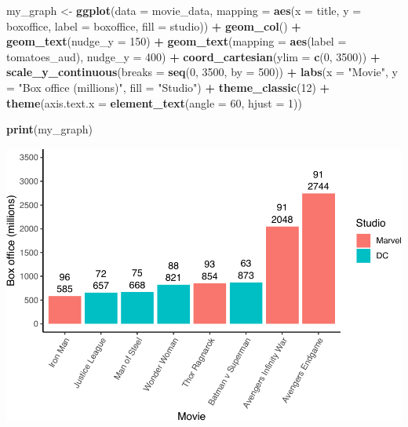 \documentclass[
]{krantz}
\makeatletter
\newenvironment{Shaded}{\begin{snugshade}}{\end{snugshade}}
\newcommand{\DataTypeTok}[1]{\textcolor[rgb]{0.27,0.27,0.27}{#1}}
\newcommand{\DecValTok}[1]{\textcolor[rgb]{0.06,0.06,0.06}{#1}}
\newcommand{\KeywordTok}[1]{\textcolor[rgb]{0.27,0.27,0.27}{\textbf{#1}}}
\newcommand{\NormalTok}[1]{#1}
\newcommand{\OperatorTok}[1]{\textcolor[rgb]{0.43,0.43,0.43}{\textbf{#1}}}
\newcommand{\StringTok}[1]{\textcolor[rgb]{0.5,0.5,0.5}{#1}}
\newenvironment{kframe}{%
\medskip{}
\setlength{\fboxsep}{.8em}
 \def\at@end@of@kframe{}%
 \ifinner\ifhmode%
  \def\at@end@of@kframe{\end{minipage}}%
  \begin{minipage}{\columnwidth}%
 \fi\fi%
 \def\FrameCommand##1{\hskip\@totalleftmargin \hskip-\fboxsep
 \colorbox{shadecolor}{##1}\hskip-\fboxsep
     \hskip-\linewidth \hskip-\@totalleftmargin \hskip\columnwidth}%
 \MakeFramed {\advance\hsize-\width
   \@totalleftmargin\z@ \linewidth\hsize
   \@setminipage}}%
 {\par\unskip\endMakeFramed%
 \at@end@of@kframe}
\renewenvironment{Shaded}{\begin{kframe}}{\end{kframe}}
\makeatother
\begin{document}
\begin{Shaded}
\begin{Highlighting}[]
\NormalTok{my_graph <-}\StringTok{ }\KeywordTok{ggplot}\NormalTok{(}\DataTypeTok{data =}\NormalTok{ movie_data,}
           \DataTypeTok{mapping =} \KeywordTok{aes}\NormalTok{(}\DataTypeTok{x =}\NormalTok{ title,}
                         \DataTypeTok{y =}\NormalTok{ boxoffice,}
                         \DataTypeTok{label =}\NormalTok{ boxoffice, }
                         \DataTypeTok{fill =}\NormalTok{ studio)) }\OperatorTok{+}
\StringTok{  }\KeywordTok{geom_col}\NormalTok{() }\OperatorTok{+}
\StringTok{  }\KeywordTok{geom_text}\NormalTok{(}\DataTypeTok{nudge_y =} \DecValTok{150}\NormalTok{)  }\OperatorTok{+}
\StringTok{  }\KeywordTok{geom_text}\NormalTok{(}\DataTypeTok{mapping =} \KeywordTok{aes}\NormalTok{(}\DataTypeTok{label =}\NormalTok{ tomatoes_aud), }
            \DataTypeTok{nudge_y =} \DecValTok{400}\NormalTok{) }\OperatorTok{+}
\StringTok{  }\KeywordTok{coord_cartesian}\NormalTok{(}\DataTypeTok{ylim =} \KeywordTok{c}\NormalTok{(}\DecValTok{0}\NormalTok{, }\DecValTok{3500}\NormalTok{)) }\OperatorTok{+}
\StringTok{  }\KeywordTok{scale_y_continuous}\NormalTok{(}\DataTypeTok{breaks =} \KeywordTok{seq}\NormalTok{(}\DecValTok{0}\NormalTok{, }\DecValTok{3500}\NormalTok{, }\DataTypeTok{by =} \DecValTok{500}\NormalTok{)) }\OperatorTok{+}
\StringTok{  }\KeywordTok{labs}\NormalTok{(}\DataTypeTok{x =} \StringTok{"Movie"}\NormalTok{,}
       \DataTypeTok{y =} \StringTok{"Box office (millions)"}\NormalTok{,}
       \DataTypeTok{fill =} \StringTok{"Studio"}\NormalTok{) }\OperatorTok{+}
\StringTok{  }\KeywordTok{theme_classic}\NormalTok{(}\DecValTok{12}\NormalTok{) }\OperatorTok{+}
\StringTok{  }\KeywordTok{theme}\NormalTok{(}\DataTypeTok{axis.text.x =} \KeywordTok{element_text}\NormalTok{(}\DataTypeTok{angle =} \DecValTok{60}\NormalTok{, }
                                   \DataTypeTok{hjust =} \DecValTok{1}\NormalTok{))  }

\KeywordTok{print}\NormalTok{(my_graph)}
\end{Highlighting}
\end{Shaded}

\includegraphics[width=0.65\linewidth]{bookdown_files/figure-latex/unnamed-chunk-280-1}
\end{document}
